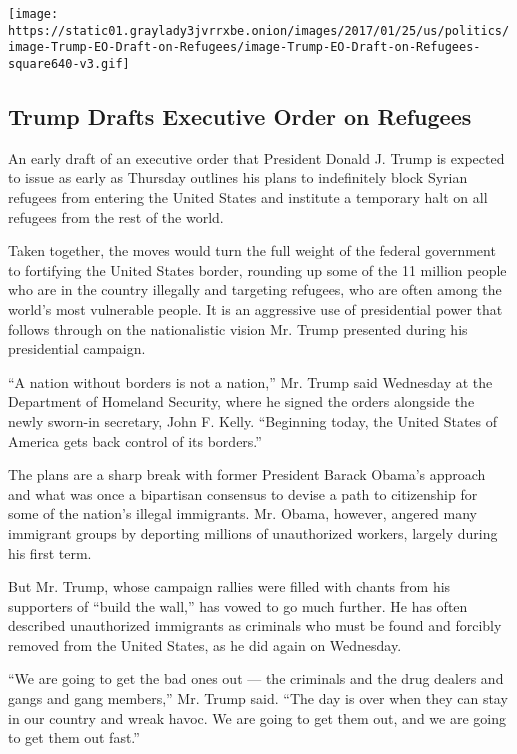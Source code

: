 \texttt{[image: https://static01.graylady3jvrrxbe.onion/images/2017/01/25/us/politics/image-Trump-EO-Draft-on-Refugees/image-Trump-EO-Draft-on-Refugees-square640-v3.gif]}

\hypertarget{trump-drafts-executive-order-on-refugees}{%
\subsection{Trump Drafts Executive Order on
Refugees}\label{trump-drafts-executive-order-on-refugees}}

An early draft of an executive order that President Donald J. Trump is
expected to issue as early as Thursday outlines his plans to
indefinitely block Syrian refugees from entering the United States and
institute a temporary halt on all refugees from the rest of the world.

Taken together, the moves would turn the full weight of the federal
government to fortifying the United States border, rounding up some of
the 11 million people who are in the country illegally and targeting
refugees, who are often among the world's most vulnerable people. It is
an aggressive use of presidential power that follows through on the
nationalistic vision Mr. Trump presented during his presidential
campaign.

``A nation without borders is not a nation,'' Mr. Trump said Wednesday
at the Department of Homeland Security, where he signed the orders
alongside the newly sworn-in secretary, John F. Kelly. ``Beginning
today, the United States of America gets back control of its borders.''

The plans are a sharp break with former President Barack Obama's
approach and what was once a bipartisan consensus to devise a path to
citizenship for some of the nation's illegal immigrants. Mr. Obama,
however, angered many immigrant groups by deporting millions of
unauthorized workers, largely during his first term.

But Mr. Trump, whose campaign rallies were filled with chants from his
supporters of ``build the wall,'' has vowed to go much further. He has
often described unauthorized immigrants as criminals who must be found
and forcibly removed from the United States, as he did again on
Wednesday.

``We are going to get the bad ones out --- the criminals and the drug
dealers and gangs and gang members,'' Mr. Trump said. ``The day is over
when they can stay in our country and wreak havoc. We are going to get
them out, and we are going to get them out fast.''


